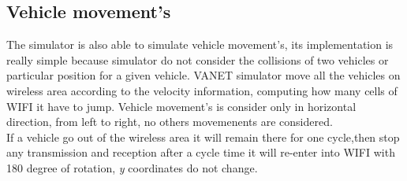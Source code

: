 \subsection{Vehicle movement's}
The simulator is also able to simulate vehicle movement's, its implementation is really simple because simulator do not consider the collisions of two vehicles or particular position for a given vehicle. VANET simulator move all the vehicles on wireless area according to the velocity information, computing how many cells of WIFI it have to jump. Vehicle movement's is consider only in horizontal direction, from left to right, no others movemenents are considered.\\
If a vehicle go out of the wireless area it will remain there for one cycle,then stop any transmission and reception after a cycle time it will re-enter into WIFI with 180 degree of rotation, \textit{y} coordinates do not change.
